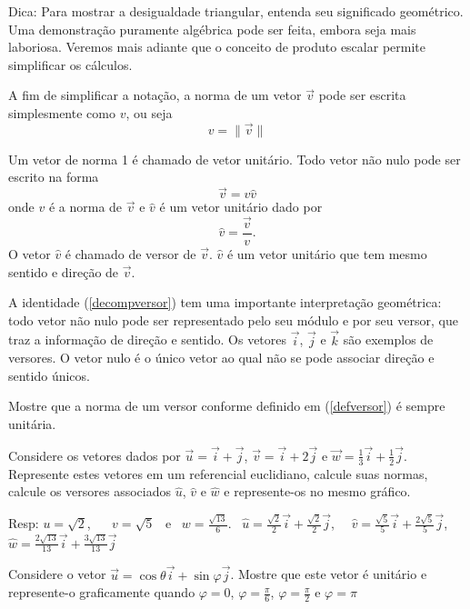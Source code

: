 Dica: Para mostrar a desigualdade triangular, entenda seu significado geométrico. Uma demonstração puramente algébrica pode ser feita, embora seja mais laboriosa. Veremos mais adiante que o conceito de produto escalar permite simplificar os cálculos. 

A fim de simplificar a notação, a norma de um vetor $\vec{v}$ pode ser escrita simplesmente como $v$, ou seja
$$v=\|\vec{v}\|$$ 

Um vetor de norma 1 é chamado de vetor unitário. Todo vetor não nulo pode ser escrito na forma
\begin{equation}\label{decompversor}\vec{v}=v \hat{v}\end{equation}
onde $v$ é a norma de $\vec{v}$ e $\hat{v}$ é um vetor unitário dado por
\begin{equation}\label{defversor}\hat{v}=\frac{\vec{v}}{v}.\end{equation}
O vetor $\hat{v}$ é chamado de versor de $\vec{v}$. $\hat{v}$ é um vetor unitário que tem mesmo sentido e direção de $\vec{v}$.

A identidade (\ref{decompversor}) tem uma importante interpretação geométrica: todo vetor não nulo pode ser representado pelo seu módulo e por seu versor, que traz a informação de direção e sentido.  Os vetores $\vec{i}$, $\vec{j}$ e $\vec{k}$ são exemplos de versores. O vetor nulo é o único vetor ao qual não se pode associar direção e sentido únicos.


\begin{exer}Mostre que a norma de um versor conforme definido em (\ref{defversor}) é sempre unitária. 
\end{exer}

\begin{exer}\label{ex1uvw} Considere os vetores dados por $\vec{u}=\vec{i}+\vec{j}$, $\vec{v}=\vec{i}+2\vec{j}$ e $\vec{w}=\frac{1}{3}\vec{i}+\frac{1}{2}\vec{j}$. Represente estes vetores em um referencial euclidiano, calcule suas normas, calcule os versores associados $\hat{u}$, $\hat{v}$ e $\hat{w}$ e represente-os no mesmo gráfico.  
\end{exer}
Resp: $u=\sqrt{2}$, ~~ $v=\sqrt{5}$ ~e~ $w=\frac{\sqrt{13}}{{6}}$.~ $\hat{u}=\frac{\sqrt{2}}{2}\vec{i}+\frac{\sqrt{2}}{2}\vec{j}$,~~  $\hat{v}=\frac{\sqrt{5}}{5}\vec{i}+\frac{2\sqrt{5}}{5}\vec{j}$,~~ $\hat{w}=\frac{2\sqrt{13}}{13}\vec{i}+\frac{3\sqrt{13}}{13}\vec{j}$

\begin{exer} Considere o vetor $\vec{u}=\cos\theta \vec{i}+ \sin\varphi \vec{j}$. Mostre que este vetor é unitário e represente-o graficamente quando $\varphi=0$, $\varphi=\frac{\pi}{6}$, $\varphi=\frac{\pi}{2}$ e $\varphi={\pi}$ 
\end{exer}

